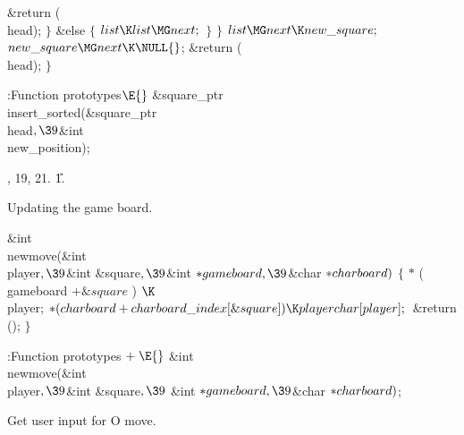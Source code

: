 \&{return} (\\{head});\6
\4${}\}{}$\2\6
\&{else}\5
${}\{{}$\1\6
${}\\{list}\K\\{list}\MG\\{next};{}$\6
\4${}\}{}$\2\6
\4${}\}{}$\2\6
${}\\{list}\MG\\{next}\K\\{new\_square};{}$\6
${}\\{new\_square}\MG\\{next}\K\NULL{}$;\6
\&{return} (\\{head});\6
\4${}\}{}$\2\par
\fi

\B{}:Function prototypes\X${}\E{}$\6
\&{square\_ptr} \\{insert\_sorted}(\&{square\_ptr} \\{head}${},\39{}$\&{int} %
\\{new\_position});\par
{}, 19, 21.
\U1.\fi

Updating the game board.

\Y\B\&{int} \\{newmove}(\&{int} \\{player}${},\39{}$\&{int} \&{square}${},%
\39{}$\&{int} ${}{*}\\{gameboard},\39{}$\&{char} ${}{*}\\{charboard}){}$\1\1 $%
\{{}$\7
$*$ ( \\{gameboard}\1\1 ${+}\&{square}$ ) $\K$ \\{player};\6
${}{*}(\\{charboard}+\\{charboard\_index}[\&{square}])\K\\{playerchar}[%
\\{player}];{}$\6
\&{return} (); $\}{}$\par
\fi

\B{}:Function prototypes\X${}\mathrel+\E{}$\6
\&{int} \\{newmove}(\&{int} \\{player}${},\39{}$\&{int} \&{square}${},\39{}$%
\&{int} ${}{*}\\{gameboard},\39{}$\&{char} ${}{*}\\{charboard}){}$;\par
\fi

Get user input for O move.

